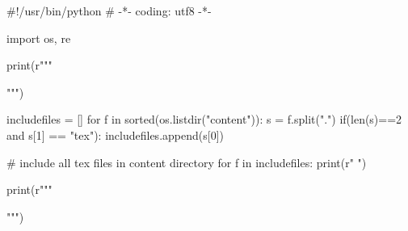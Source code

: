#!/usr/bin/python
# -*- coding: utf8 -*-
  
import os, re

print(r"""


\newcommand{\art}{}
\renewcommand{\author}{Steve Göring}

\newcommand{\thema}{CloudTag \\{\small --Ein Tag Cloud Generator-- } \\[2em] {\small Programmierwettbewerb \\ Freies Magazin 04-2012 } }



    
    
    
    
    \tableofcontents %
    
    \newpage
   
""")

includefiles = []
for f in sorted(os.listdir("content")):
    s = f.split(".")
    if(len(s)==2 and s[1] == "tex"):
        includefiles.append(s[0])

# include all tex files in content directory
for f in includefiles:
    print(r"    ")
   
print(r"""    



""")


